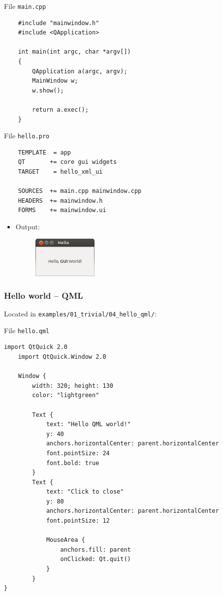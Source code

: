 \begin{frame}[fragile]
  File \texttt{main.cpp}

  \begin{lstlisting}
	#include "mainwindow.h"
	#include <QApplication>

	int main(int argc, char *argv[])
	{
	    QApplication a(argc, argv);
	    MainWindow w;
	    w.show();

	    return a.exec();
	}
  \end{lstlisting}
\end{frame}


\begin{frame}[fragile]
  File \texttt{hello.pro}

  \begin{lstlisting}
	TEMPLATE  = app
	QT       += core gui widgets
	TARGET    = hello_xml_ui

	SOURCES  += main.cpp mainwindow.cpp
	HEADERS  += mainwindow.h
	FORMS    += mainwindow.ui
  \end{lstlisting}

  \begin{itemize}
  \item Output:
    \begin{figure}[!t]
    \includegraphics[width=0.3\textwidth]{images/hello_gui.png}
    \end{figure}
  \end{itemize}

\end{frame}


\begin{frame}[fragile]
  \frametitle{Hello world -- QML}
  Located in \texttt{examples/01\_trivial/04\_hello\_qml/}:

  File \texttt{hello.qml}

  \begin{lstlisting}[basicstyle=\tiny\ttfamily]
	import QtQuick 2.0
	import QtQuick.Window 2.0

	Window {
	    width: 320; height: 130
	    color: "lightgreen"

	    Text {
	        text: "Hello QML world!"
	        y: 40
	        anchors.horizontalCenter: parent.horizontalCenter
	        font.pointSize: 24
	        font.bold: true
	    }
	    Text {
	        text: "Click to close"
	        y: 80
	        anchors.horizontalCenter: parent.horizontalCenter
	        font.pointSize: 12

	        MouseArea {
	            anchors.fill: parent
	            onClicked: Qt.quit()
	        }
	    }
}
  \end{lstlisting}

\end{frame}

